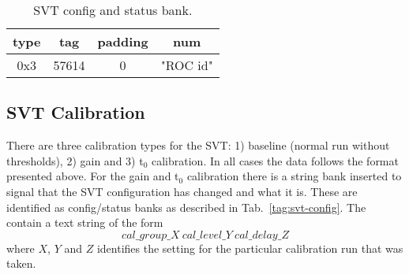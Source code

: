 \documentclass{desyproc}
\begin{document}
\begin{table}[]
  \begin{center}
    \caption{SVT config and status bank.}
    \label{tab:svt-config}
    \begin{tabular}{|c|c|c|c|}
   	\hline
    	 type & tag & padding & num \\
	 \hline
    	 0x3 & 57614 & 0 & "ROC id" \\
	 \hline
      \end{tabular}
  \end{center}
\end{table}




\subsection{SVT Calibration}

There are three calibration types for the SVT: 1) baseline  (normal run without thresholds), 2) gain and 3) t$_{0}$ calibration. In all cases the data follows the format presented above. For the gain and t$_0$ calibration there is a string bank inserted to signal that the SVT configuration has changed and what it is. These are identified as config/status banks as described in Tab.~\ref{tag:svt-config}. The contain a text string of the form 
\begin{equation}
cal\_group\_X\ cal\_level\_Y\ cal\_delay\_Z
\end{equation}
where $X$, $Y$ and $Z$ identifies the setting for the particular calibration run that was taken. 






\end{document}
